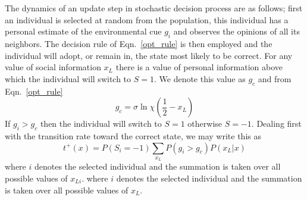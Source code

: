 \documentclass[aps,prl,twocolumn,showpacs,superscriptaddress,groupedaddress]{revtex4}
\begin{document}
The dynamics of an update step in stochastic decision process are as follows; first an individual is selected at random from the population, this individual has a personal estimate of the environmental cue $g_i$ and observes the opinions of all its neighbors. The decision rule of Eqn.~\ref{opt_rule} is then employed and the individual will adopt, or remain in, the state most likely to be correct.
For any value of social information $x_L$ there is a value of personal information above which the individual will switch to $S=1$. We denote this value as $g_c$ and from Eqn.~\ref{opt_rule} 
\begin{equation}
g_c  = \sigma\ln\chi  \left(\frac{1}{2}-x_L\right) 
\end{equation}
If $g_i>g_c$ then the individual will switch to $S=1$ otherwise $S=-1$. 
Dealing first with the transition rate toward the correct state, we may write this as
\begin{equation}
t^+(x) = P(S_i=-1)\sum_{x_{L}}P\left(g_i>g_c \right)P\left(x_{L}|x\right)
\label{up}
\end{equation}
where $i$ denotes the selected individual and the summation is taken over all possible values of $x_{Li}$.
where $i$ denotes the selected individual and the summation is taken over all possible values of $x_{L}$. 
\end{document}
